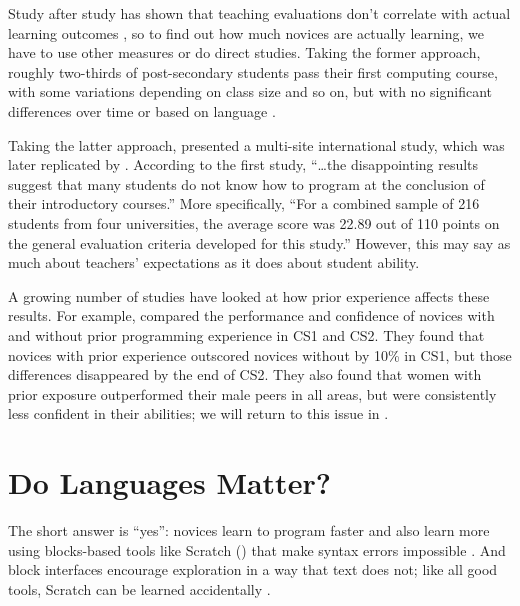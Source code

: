 Study after study has shown that teaching evaluations don't correlate
with actual learning outcomes \cite{Star2014,Uttl2017}, so to find out
how much novices are actually learning, we have to use other measures
or do direct studies.  Taking the former approach, roughly two-thirds
of post-secondary students pass their first computing course, with
some variations depending on class size and so on, but with no
significant differences over time or based on language
\cite{Benn2007a,Wats2014}.

Taking the latter approach, \cite{McCr2001} presented a multi-site
international study, which was later replicated by \cite{Utti2013}.
According to the first study, ``{\ldots}the disappointing results
suggest that many students do not know how to program at the
conclusion of their introductory courses.''  More specifically, ``For
a combined sample of 216 students from four universities, the average
score was 22.89 out of 110 points on the general evaluation criteria
developed for this study.''  However, this may say as much about
teachers' expectations as it does about student ability.

A growing number of studies have looked at how prior experience
affects these results.  For example, \cite{Wilc2018} compared the
performance and confidence of novices with and without prior
programming experience in CS1 and CS2.  They found that novices with
prior experience outscored novices without by 10\% in CS1, but those
differences disappeared by the end of CS2.  They also found that women
with prior exposure outperformed their male peers in all areas, but
were consistently less confident in their abilities; we will return to
this issue in .

\section{Do Languages Matter?}\label{s:pck-language}

The short answer is ``yes'': novices learn to program faster and also
learn more using blocks-based tools like Scratch
() that make syntax errors impossible
\cite{Wein2017b}.  And block interfaces encourage exploration in a way
that text does not; like all good tools, Scratch can be learned
accidentally \cite{Malo2010}.

